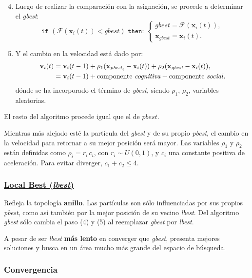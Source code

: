 \documentclass[10pt,a4paper]{article}
\begin{document}
\begin{enumerate}
\setcounter{enumi}{3}
\item Luego de realizar la comparación con la asignación, se procede a determinar el \textit{gbest}:
\[
	\texttt{if } \left( \mathcal{F} (\mathbf{x}_i(t)) < \textit{gbest} \right) \texttt{ then: } \left\{
	\begin{array}{l}
	\textit{gbest} = \mathcal{F}(\mathbf{x}_i(t)),\\
	\mathbf{x}_{\textit{gbest}} = \mathbf{x}_i(t).
	\end{array}
	\right.
\]
\item Y el cambio en la velocidad está dado por:
\begin{align*}
\mathbf{v}_{i}(t) &= \mathbf{v}_{i}(t-1) + \rho_1(\mathbf{x}_{\textit{pbest}_i}- \mathbf{x}_i(t)) + \rho_2(\mathbf{x}_{\textit{gbest}}- \mathbf{x}_i(t)),\\
&= \mathbf{v}_{i}(t-1) + \text{componente \textit{cognitiva}} + \text{componente \textit{social}}.
\end{align*}
dónde se ha incorporado el término de \textit{gbest}, siendo $\rho_1$, $\rho_2$, variables aleatorias.
\end{enumerate}

El resto del algoritmo procede igual que el de $pbest$. 

Mientras más alejado esté la partícula del \textit{gbest} y de su propio \textit{pbest}, el cambio en la velocidad para retornar a su mejor posición será mayor. Las variables $\rho_1$ y $\rho_2$ están definidas como $\rho_i=r_i\,c_i$, con $r_i \sim U(0,1)$, y $c_i$ una constante positiva de aceleración. Para evitar diverger, $c_1 + c_2 \leq 4$.

\subsubsection*{\underline{Local Best (\textit{lbest})}}

Refleja la topología \textbf{anillo}. Las partículas son sólo influenciadas por sus propios \textit{pbest}, como así también por la mejor posición de su vecino \textit{lbest}. Del algoritmo \textit{gbest} sólo cambia el paso (4) y (5) al reemplazar \textit{gbest} por \textit{lbest}.

A pesar de ser \textit{lbest} \textbf{más lento} en converger que \textit{gbest}, presenta mejores soluciones y busca en un área mucho más grande del espacio de búsqueda.

\subsubsection{Convergencia}
\end{document}
